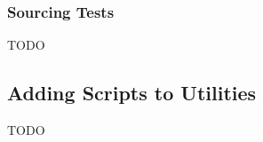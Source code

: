 \documentclass[12pt]{article}
\begin{document}
\subsubsection{Sourcing Tests}
\label{section:source_tests}
TODO

\subsection{Adding Scripts to Utilities}
\label{section:utilities-detail}
TODO
\end{document}
